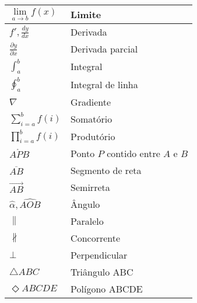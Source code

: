 \begin{center}
\begin{longtable}{| m{3cm} | m{12cm} |}
            \hline $ \lim\limits_{a \to b} f(x) $ & Limite\\
            \hline $ f', \frac{dy}{dx} $ & Derivada\\
            \hline $ \frac{\partial y}{\partial x}  $ & Derivada parcial\\
            \hline $ \int_a^b $ & Integral\\
            \hline $ \oint_a^b $ & Integral de linha\\
            \hline $ \nabla $ & Gradiente\\
            \hline $ \displaystyle\sum_{i=a}^{b} f(i) $ & Somatório\\
            \hline $ \displaystyle\prod_{i=a}^{b} f(i) $ & Produtório\\
            \hline $ \mathring{APB} $ & Ponto $P$ contido entre $A$ e $B$\\
            \hline $ \overline{AB} $ & Segmento de reta\\
            \hline $ \overrightarrow{AB} $ & Semirreta\\
            \hline $ \hat{\alpha}, \hat{AOB} $ & Ângulo\\
            \hline $ \parallel $ & Paralelo\\
            \hline $ \nparallel $ & Concorrente\\
            \hline $ \bot $ & Perpendicular\\
            \hline $ \triangle ABC $ & Triângulo ABC\\
            \hline $ \Diamond ABCDE $ & Polígono ABCDE\\
            \hline
        \end{longtable}
    \end{center}
